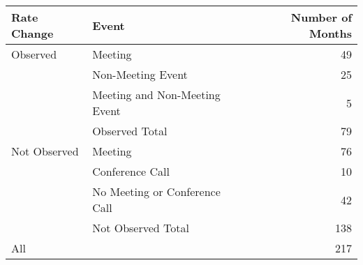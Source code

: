 \begin{tabular}{llr}
\toprule
  Rate Change &                          Event &  Number of Months \\
\midrule
     Observed &                        Meeting &                49 \\
              &              Non-Meeting Event &                25 \\
              &  Meeting and Non-Meeting Event &                 5 \\
              &                 Observed Total &                79 \\
 \hline Not Observed &                        Meeting &                76 \\
              &                Conference Call &                10 \\
              &  No Meeting or Conference Call &                42 \\
              &             Not Observed Total &               138 \\
          \hline\hline All &                                &               217 \\
\bottomrule
\end{tabular}
